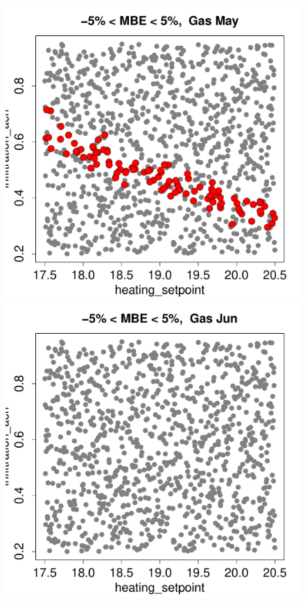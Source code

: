 \documentclass[a4paper, 12pt]{article}
\begin{document}
\begin{figure}
 \includegraphics[width=\scale]{MBE/SelectedMBE_Gas_05.pdf}
 \includegraphics[width=\scale]{MBE/SelectedMBE_Gas_06.pdf}\\

\end{figure}
\end{document}
